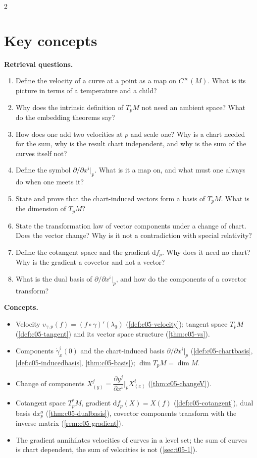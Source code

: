 \begin{paracol}{2}
\section*{Key concepts}
\begin{keyconcepts}
\textbf{Retrieval questions.}
\begin{enumerate}
  \item Define the velocity of a curve at a point as a map on $C^\infty(M)$. What is its picture in terms of a temperature and a child?
  \item Why does the intrinsic definition of $T_pM$ not need an ambient space? What do the embedding theorems say?
  \item How does one add two velocities at $p$ and scale one? Why is a chart needed for the sum, why is the result chart independent, and why is the sum of the curves itself not?
  \item Define the symbol $\partial/\partial x^i|_p$. What is it a map on, and what must one always do when one meets it?
  \item State and prove that the chart-induced vectors form a basis of $T_pM$. What is the dimension of $T_pM$?
  \item State the transformation law of vector components under a change of chart. Does the vector change? Why is it not a contradiction with special relativity?
  \item Define the cotangent space and the gradient $\mathrm df_p$. Why does it need no chart? Why is the gradient a covector and not a vector?
  \item What is the dual basis of $\partial/\partial x^i|_p$, and how do the components of a covector transform?
\end{enumerate}
\textbf{Concepts.}
\begin{itemize}
  \item Velocity $v_{\gamma,p}(f)=(f\circ\gamma)'(\lambda_0)$ (\cref{def:c05-velocity}); tangent space $T_pM$ (\cref{def:c05-tangent}) and its vector space structure (\cref{thm:c05-vs}).
  \item Components $\dot\gamma^i_x(0)$ and the chart-induced basis $\partial/\partial x^i|_p$ (\cref{def:c05-chartbasis}, \cref{def:c05-inducedbasis}, \cref{thm:c05-basis}); $\dim T_pM=\dim M$.
  \item Change of components $X^j_{(y)}=\dfrac{\partial y^j}{\partial x^i}\Big|_pX^i_{(x)}$ (\cref{thm:c05-changeV}).
  \item Cotangent space $T^*_pM$, gradient $\mathrm df_p(X)=X(f)$ (\cref{def:c05-cotangent}), dual basis $\mathrm dx^a_p$ (\cref{thm:c05-dualbasis}), covector components transform with the inverse matrix (\cref{rem:c05-gradient}).
  \item The gradient annihilates velocities of curves in a level set; the sum of curves is chart dependent, the sum of velocities is not (\cref{sec:t05-1}).
\end{itemize}
\end{keyconcepts}

\flushside
\end{paracol}
